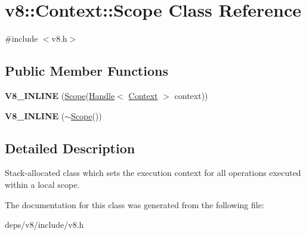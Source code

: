 \hypertarget{classv8_1_1_context_1_1_scope}{}\section{v8\+:\+:Context\+:\+:Scope Class Reference}
\label{classv8_1_1_context_1_1_scope}


{\ttfamily \#include $<$v8.\+h$>$}

\subsection*{Public Member Functions}
\begin{DoxyCompactItemize}
\item 
\hypertarget{classv8_1_1_context_1_1_scope_a193358558d5c1f62b6900b9d8de6807e}{}{\bfseries V8\+\_\+\+I\+N\+L\+I\+N\+E} (\hyperlink{classv8_1_1_context_1_1_scope}{Scope}(\hyperlink{classv8_1_1_handle}{Handle}$<$ \hyperlink{classv8_1_1_context}{Context} $>$ context))\label{classv8_1_1_context_1_1_scope_a193358558d5c1f62b6900b9d8de6807e}

\item 
\hypertarget{classv8_1_1_context_1_1_scope_ac2a1c73e596c9f2f9921bd9d629ee9d2}{}{\bfseries V8\+\_\+\+I\+N\+L\+I\+N\+E} ($\sim$\hyperlink{classv8_1_1_context_1_1_scope}{Scope}())\label{classv8_1_1_context_1_1_scope_ac2a1c73e596c9f2f9921bd9d629ee9d2}

\end{DoxyCompactItemize}


\subsection{Detailed Description}
Stack-\/allocated class which sets the execution context for all operations executed within a local scope. 

The documentation for this class was generated from the following file\+:\begin{DoxyCompactItemize}
\item 
deps/v8/include/v8.\+h\end{DoxyCompactItemize}
